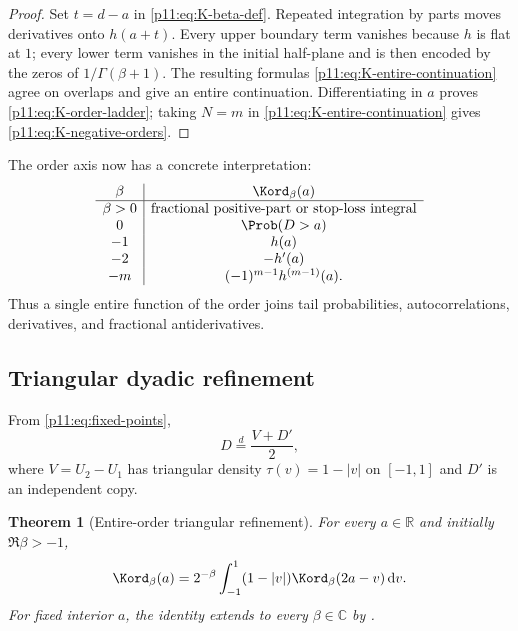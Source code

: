 \documentclass[11pt,oneside]{article}
\newtheorem{theorem}{Theorem}[section]
\theoremstyle{definition}
\theoremstyle{remark}
\newcommand{\R}{\mathbb R}
\newcommand{\C}{\mathbb C}
\newcommand{\dd}{\,\mathrm d}
\newcommand{\1}{\mathbf 1}
\begin{document}
\begin{proof}
Set $t=d-a$ in \eqref{p11:eq:K-beta-def}.  Repeated integration by parts moves
derivatives onto $h(a+t)$.  Every upper boundary term vanishes because $h$
is flat at $1$; every lower term vanishes in the initial half-plane and is
then encoded by the zeros of $1/\Gamma(\beta+1)$.  The resulting formulas
\eqref{p11:eq:K-entire-continuation} agree on overlaps and give an entire
continuation.  Differentiating in $a$ proves \eqref{p11:eq:K-order-ladder}; taking
$N=m$ in \eqref{p11:eq:K-entire-continuation} gives
\eqref{p11:eq:K-negative-orders}.
\end{proof}

The order axis now has a concrete interpretation:
\begin{equation}
 \begin{array}{c|c}
 \beta & \Kord_\beta(a)\\ \hline
 \beta>0 & \text{fractional positive-part or stop-loss integral}\\
 0 & \Prob(D>a)\\
 -1 & h(a)\\
 -2 & -h'(a)\\
 -m & (-1)^{m-1}h^{(m-1)}(a).
 \end{array}
 \label{p11:eq:K-order-dictionary}
\end{equation}
Thus a single entire function of the order joins tail probabilities,
autocorrelations, derivatives, and fractional antiderivatives.

\subsection{Triangular dyadic refinement}

From \eqref{p11:eq:fixed-points},
\begin{equation}
 D\overset d=\frac{V+D'}2,
 \label{p11:eq:D-fixed-point}
\end{equation}
where $V=U_2-U_1$ has triangular density
$\tau(v)=1-|v|$ on $[-1,1]$ and $D'$ is an independent copy.

\begin{theorem}[Entire-order triangular refinement]
\label{p11:thm:K-refinement}
For every $a\in\R$ and initially $\Re\beta>-1$,
\begin{equation}
 \Kord_\beta(a)
 =2^{-\beta}\int_{-1}^{1}(1-|v|)
  \Kord_\beta(2a-v)\dd v.
 \label{p11:eq:K-refinement}
\end{equation}
For fixed interior $a$, the identity extends to every $\beta\in\C$ by
.
\end{theorem}
\end{document}
